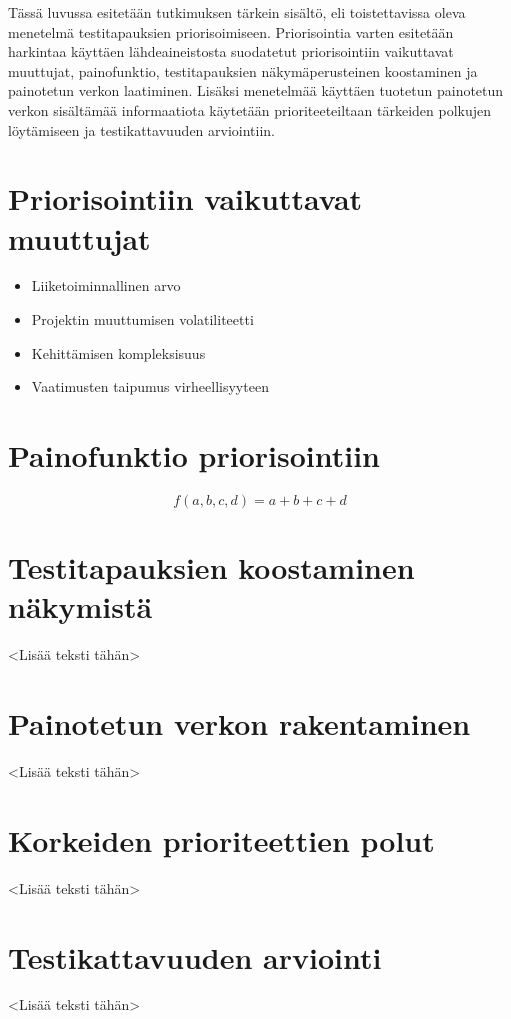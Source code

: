 Tässä luvussa esitetään tutkimuksen tärkein sisältö, eli toistettavissa oleva menetelmä testitapauksien priorisoimiseen.
Priorisointia varten esitetään harkintaa käyttäen lähdeaineistosta suodatetut priorisointiin vaikuttavat muuttujat, painofunktio, testitapauksien näkymäperusteinen koostaminen ja painotetun verkon laatiminen.
Lisäksi menetelmää käyttäen tuotetun painotetun verkon sisältämää informaatiota käytetään prioriteeteiltaan tärkeiden polkujen löytämiseen ja testikattavuuden arviointiin.

\section{Priorisointiin vaikuttavat muuttujat}

\begin{itemize}
  \item Liiketoiminnallinen arvo
  \item Projektin muuttumisen volatiliteetti
  \item Kehittämisen kompleksisuus
  \item Vaatimusten taipumus virheellisyyteen
\end{itemize}

\section{Painofunktio priorisointiin}

\[f(a,b,c,d) = a+b+c+d\]

\section{Testitapauksien koostaminen näkymistä}

<Lisää teksti tähän>

\section{Painotetun verkon rakentaminen}

<Lisää teksti tähän>

\section{Korkeiden prioriteettien polut}

<Lisää teksti tähän>

\section{Testikattavuuden arviointi}

<Lisää teksti tähän>
